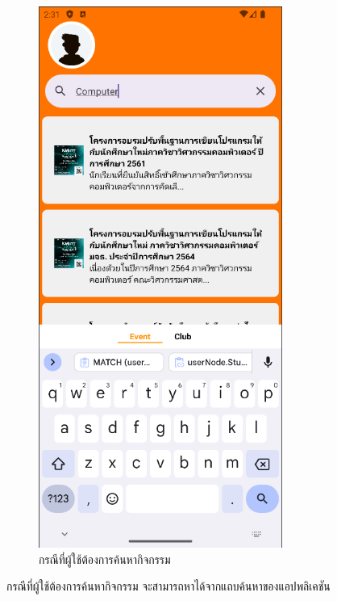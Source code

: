 \documentclass[14pt,oneside,openright,a4paper]{cpe-thai-project}
\begin{document}
\begin{figure}[!h]\centering
  \includegraphics[width=8cm]{./Pictures/Search.png}
  \caption{กรณีที่ผู้ใช้ต้องการค้นหากิจกรรม}\label{fig:SearchTest}
\end{figure}
  \hspace*{1cm} กรณีที่ผู้ใช้ต้องการค้นหากิจกรรม จะสามารถหาได้จากแถบค้นหาของแอปพลิเคชัน

\newpage
\end{document}
